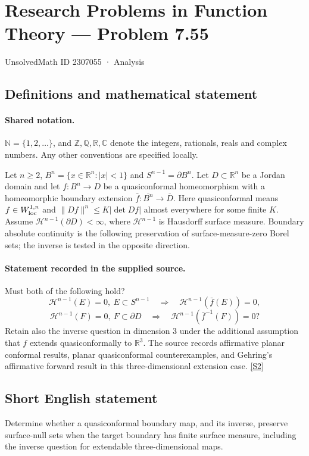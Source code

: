 \documentclass[11pt]{article}
\newcommand{\sref}[2]{\hyperlink{source:#1:#2}{[S#2]}}
\begin{document}
\setcounter{section}{2307054}
\section{Research Problems in Function Theory — Problem 7.55}\label{2307055}
{\small\sffamily UnsolvedMath ID 2307055 · Analysis}
\subsection{Definitions and mathematical statement}

\paragraph{Shared notation.}$\mathbb N=\{1,2,\ldots\}$, and $\mathbb Z,\mathbb Q,\mathbb R,\mathbb C$ denote the integers, rationals, reals and complex numbers. Any other conventions are specified locally.


Let $n\ge2$, $B^n=\{x\in\mathbb R^n:|x|<1\}$ and $S^{n-1}=\partial B^n$. Let $D\subset\mathbb R^n$ be a Jordan domain and let $f:B^n\to D$ be a quasiconformal homeomorphism with a homeomorphic boundary extension $\bar f:\overline{B^n}\to\overline D$. Here quasiconformal means $f\in W^{1,n}_{\rm loc}$ and $\|Df\|^n\le K|\det Df|$ almost everywhere for some finite $K$. Assume $\mathcal H^{n-1}(\partial D)<\infty$, where $\mathcal H^{n-1}$ is Hausdorff surface measure. Boundary absolute continuity is the following preservation of surface-measure-zero Borel sets; the inverse is tested in the opposite direction.
\paragraph{Statement recorded in the supplied source.}
Must both of the following hold?
\[\mathcal H^{n-1}(E)=0,\ E\subset S^{n-1}\quad\Longrightarrow\quad\mathcal H^{n-1}(\bar f(E))=0,
\]
\[\mathcal H^{n-1}(F)=0,\ F\subset\partial D\quad\Longrightarrow\quad\mathcal H^{n-1}(\bar f^{-1}(F))=0?
\]
Retain also the inverse question in dimension $3$ under the additional assumption that $f$ extends quasiconformally to $\mathbb R^3$. The source records affirmative planar conformal results, planar quasiconformal counterexamples, and Gehring's affirmative forward result in this three-dimensional extension case. \sref{2307055}{2}
\subsection{Short English statement}
Determine whether a quasiconformal boundary map, and its inverse, preserve surface-null sets when the target boundary has finite surface measure, including the inverse question for extendable three-dimensional maps.
\end{document}
